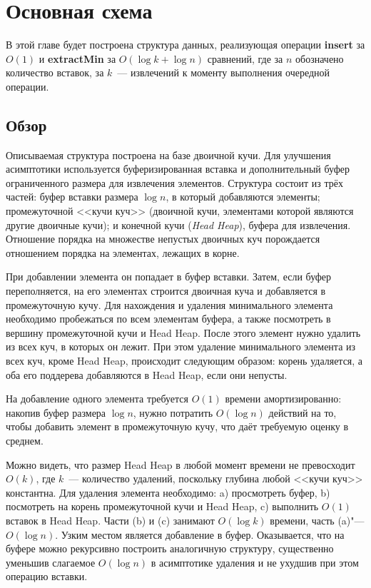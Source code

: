 

\chapter{Основная схема} \label{chapt1}

В этой главе будет построена структура данных, реализующая операции \textbf{insert}
за $O(1)$ и \textbf{extractMin} за $O(\log k + \log n)$ сравнений, где
за $n$ обозначено количество вставок, за $k$~--- извлечений к моменту выполнения
очередной операции.

\section{Обзор}
Описываемая структура построена на базе двоичной кучи. Для улучшения
асимптотики используется буферизированная вставка и дополнительный буфер
ограниченного размера для извлечения элементов. Структура состоит из трёх
частей: буфер вставки размера $\log n$, в который добавляются элементы; промежуточной
<<кучи куч>> (двоичной кучи, элементами которой являются другие двоичные кучи);
и конечной кучи (\emph{Head Heap}), буфера для извлечения. Отношение порядка
на множестве непустых двоичных куч порождается отношением порядка на элементах,
лежащих в корне.

При добавлении элемента он попадает в буфер вставки. Затем, если буфер переполняется,
на его элементах строится двоичная куча и добавляется в промежуточную кучу.
Для нахождения и удаления минимального элемента необходимо пробежаться по всем
элементам буфера, а также посмотреть в вершину промежуточной кучи и Head Heap.
После этого элемент нужно удалить из всех куч, в которых он лежит. При этом
удаление минимального элемента из всех куч, кроме Head Heap, происходит следующим образом:
корень удаляется, а оба его поддерева добавляются в Head Heap, если они непусты.

На добавление одного элемента требуется $O(1)$ времени амортизированно: накопив
буфер размера $\log n$, нужно потратить $O(\log n)$ действий на то, чтобы добавить
элемент в промежуточную кучу, что даёт требуемую оценку в среднем.

Можно видеть, что размер Head Heap в любой момент времени не превосходит $O(k)$, где
$k$~--- количество удалений, поскольку глубина любой <<кучи куч>> константна.
Для удаления элемента необходимо: a) просмотреть буфер, b) посмотреть
на корень промежуточной кучи и Head Heap, c) выполнить $O(1)$ вставок в Head Heap.
Части (b) и (c) занимают $O(\log k)$ времени, часть (a)"--- $O(\log n)$.
Узким местом является добавление в буфер. Оказывается, что на буфере можно
рекурсивно построить аналогичную структуру, существенно уменьшив слагаемое
$O(\log n)$ в асимптотике удаления и не ухудшив при этом операцию вставки.

